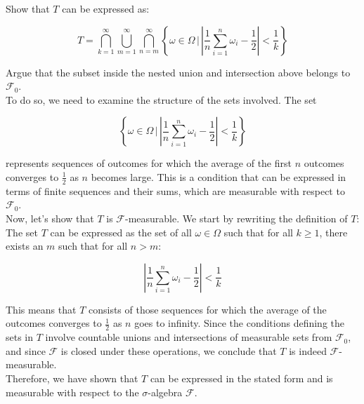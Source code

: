 \begin{example}
    Show that \( T \) can be expressed as:

\[
T = \bigcap_{k=1}^{\infty} \bigcup_{m=1}^{\infty} \bigcap_{n=m}^{\infty} \left\{ \omega \in \Omega \, \bigg| \, \left| \frac{1}{n} \sum_{i=1}^{n} \omega_i - \frac{1}{2} \right| < \frac{1}{k} \right\} 
\]

Argue that the subset inside the nested union and intersection above belongs to \( \mathcal{F}_0 \). \\

To do so, we need to examine the structure of the sets involved. The set 

\[
\left\{ \omega \in \Omega \, \bigg| \, \left| \frac{1}{n} \sum_{i=1}^{n} \omega_i - \frac{1}{2} \right| < \frac{1}{k} \right\}
\]

represents sequences of outcomes for which the average of the first \( n \) outcomes converges to \( \frac{1}{2} \) as \( n \) becomes large. This is a condition that can be expressed in terms of finite sequences and their sums, which are measurable with respect to \( \mathcal{F}_0 \).\\

Now, let's show that \( T \) is \( \mathcal{F} \)-measurable. We start by rewriting the definition of \( T \):\\

The set \( T \) can be expressed as the set of all \( \omega \in \Omega \) such that for all \( k \geq 1 \), there exists an \( m \) such that for all \( n > m \):

\[
\left| \frac{1}{n} \sum_{i=1}^{n} \omega_i - \frac{1}{2} \right| < \frac{1}{k}
\]

This means that \( T \) consists of those sequences for which the average of the outcomes converges to \( \frac{1}{2} \) as \( n \) goes to infinity. Since the conditions defining the sets in \( T \) involve countable unions and intersections of measurable sets from \( \mathcal{F}_0 \), and since \( \mathcal{F} \) is closed under these operations, we conclude that \( T \) is indeed \( \mathcal{F} \)-measurable.\\

Therefore, we have shown that \( T \) can be expressed in the stated form and is measurable with respect to the \( \sigma \)-algebra \( \mathcal{F} \).

\end{example}